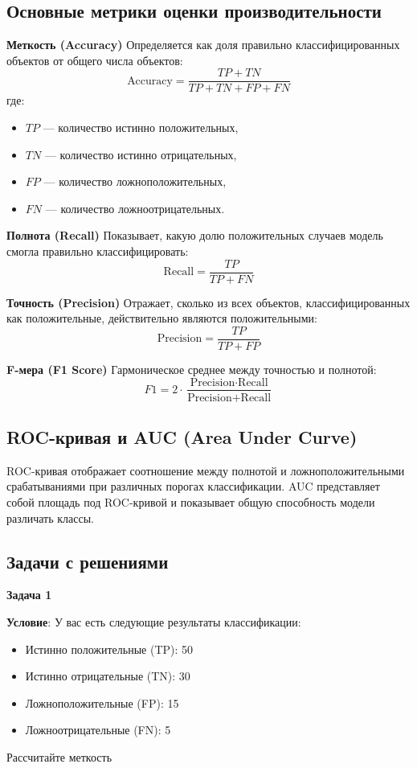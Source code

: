 \subsection{Основные метрики оценки производительности}

\textbf{Меткость (Accuracy)}
Определяется как доля правильно классифицированных объектов от общего числа объектов:
\[
    \text{Accuracy} = \frac{TP + TN}{TP + TN + FP + FN}
\]
где:
\begin{itemize}
    \item \(TP\) — количество истинно положительных,
    \item \(TN\) — количество истинно отрицательных,
    \item \(FP\) — количество ложноположительных,
    \item \(FN\) — количество ложноотрицательных.
\end{itemize}

\textbf{Полнота (Recall)}
Показывает, какую долю положительных случаев модель смогла правильно классифицировать:
\[
    \text{Recall} = \frac{TP}{TP + FN}
\]

\textbf{Точность (Precision)}
Отражает, сколько из всех объектов, классифицированных как положительные, действительно являются положительными:
\[
    \text{Precision} = \frac{TP}{TP + FP}
\]

\textbf{F-мера (F1 Score)}
Гармоническое среднее между точностью и полнотой:
\[
    F1 = 2 \cdot \frac{\text{Precision} \cdot \text{Recall}}{\text{Precision} + \text{Recall}}
\]

\subsection{ROC-кривая и AUC (Area Under Curve)}
ROC-кривая отображает соотношение между полнотой и ложноположительными срабатываниями при различных порогах классификации. AUC представляет собой площадь под ROC-кривой и показывает общую способность модели различать классы.

\subsection{Задачи с решениями}

\textbf{Задача 1}

\textbf{Условие}: У вас есть следующие результаты классификации:

\begin{itemize}
    \item Истинно положительные (TP): 50
    \item Истинно отрицательные (TN): 30
    \item Ложноположительные (FP): 15
    \item Ложноотрицательные (FN): 5
\end{itemize}
Рассчитайте меткость

